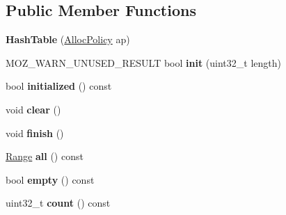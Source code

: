 \subsection*{Public Member Functions}
\begin{DoxyCompactItemize}
\item 
\hypertarget{classjs_1_1detail_1_1_hash_table_a216372476778fd3dbc5508254d0c23ae}{{\bfseries Hash\-Table} (\hyperlink{class_alloc_policy}{Alloc\-Policy} ap)}\label{classjs_1_1detail_1_1_hash_table_a216372476778fd3dbc5508254d0c23ae}

\item 
\hypertarget{classjs_1_1detail_1_1_hash_table_ac3e5f422cf6bfaba624dac0c65fc5b9d}{M\-O\-Z\-\_\-\-W\-A\-R\-N\-\_\-\-U\-N\-U\-S\-E\-D\-\_\-\-R\-E\-S\-U\-L\-T bool {\bfseries init} (uint32\-\_\-t length)}\label{classjs_1_1detail_1_1_hash_table_ac3e5f422cf6bfaba624dac0c65fc5b9d}

\item 
\hypertarget{classjs_1_1detail_1_1_hash_table_afc6e176a575620e0b49d5cdf8c619123}{bool {\bfseries initialized} () const }\label{classjs_1_1detail_1_1_hash_table_afc6e176a575620e0b49d5cdf8c619123}

\item 
\hypertarget{classjs_1_1detail_1_1_hash_table_a3b07620ba2bf328a08c2d0590f0e13ab}{void {\bfseries clear} ()}\label{classjs_1_1detail_1_1_hash_table_a3b07620ba2bf328a08c2d0590f0e13ab}

\item 
\hypertarget{classjs_1_1detail_1_1_hash_table_ac5941edbf037ba717be555ca7ede368b}{void {\bfseries finish} ()}\label{classjs_1_1detail_1_1_hash_table_ac5941edbf037ba717be555ca7ede368b}

\item 
\hypertarget{classjs_1_1detail_1_1_hash_table_a4cd666c160371c15034c8adbf58c4b8f}{\hyperlink{classjs_1_1detail_1_1_hash_table_1_1_range}{Range} {\bfseries all} () const }\label{classjs_1_1detail_1_1_hash_table_a4cd666c160371c15034c8adbf58c4b8f}

\item 
\hypertarget{classjs_1_1detail_1_1_hash_table_aa6af4caf09376d068439e51406de349e}{bool {\bfseries empty} () const }\label{classjs_1_1detail_1_1_hash_table_aa6af4caf09376d068439e51406de349e}

\item 
\hypertarget{classjs_1_1detail_1_1_hash_table_ad1615531fe85cd32773073cb6831cc4a}{uint32\-\_\-t {\bfseries count} () const }\label{classjs_1_1detail_1_1_hash_table_ad1615531fe85cd32773073cb6831cc4a}


\end{DoxyCompactItemize}
